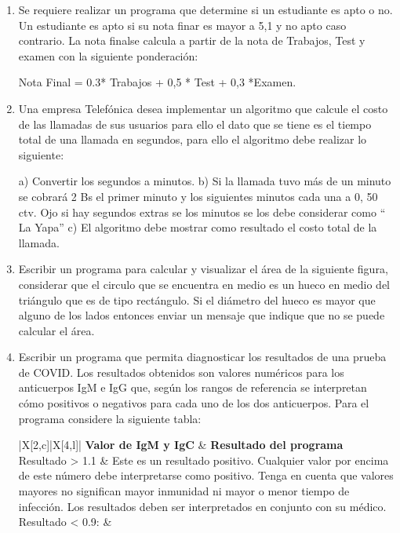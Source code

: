 \documentclass{scrartcl}
\begin{document}
\begin{enumerate}
		\item Se requiere realizar un programa que determine si un estudiante es apto o no. Un estudiante es apto si su nota finar es mayor a 5,1 y no apto caso contrario. La nota finalse calcula a partir de la nota de Trabajos, Test y examen con la siguiente ponderación:
		
		Nota Final = 0.3* Trabajos + 0,5 * Test + 0,3 *Examen.
		
		\item Una empresa Telefónica desea implementar un algoritmo que calcule el costo de las llamadas de sus usuarios para ello el dato que se tiene es el tiempo total de una llamada en segundos, para ello el algoritmo debe realizar lo siguiente:
		
		a) Convertir los segundos a minutos.
		b) Si la llamada tuvo más de un minuto se cobrará 2 Bs el primer minuto y los
		siguientes minutos cada una a 0, 50 ctv. Ojo si hay segundos extras se los
		minutos se los debe considerar como “ La Yapa”
		c) El algoritmo debe mostrar como resultado el costo total de la llamada.
		
		\item Escribir un programa para calcular y visualizar el área de la siguiente figura, considerar que el circulo que se encuentra en medio es un hueco en medio del triángulo que es de tipo rectángulo. Si el diámetro del hueco es mayor que alguno de los lados entonces enviar un mensaje que indique que no se puede calcular el área.
		
		\item Escribir un programa que permita diagnosticar los resultados de una prueba de COVID. Los resultados obtenidos son valores numéricos para los anticuerpos IgM e IgG que, según los rangos de referencia se interpretan cómo positivos o negativos para cada uno de los dos anticuerpos. Para el programa considere la siguiente tabla:
		
		\begin{table}[ht]
			\centering
			\begin{tblr}{|X[2,c]|X[4,l]|}
					\hline
					\textbf{Valor de IgM y IgC} & \textbf{Resultado del programa} \\
					Resultado > 1.1  &  
					\hline
					Este es un resultado positivo. Cualquier valor por encima de este número debe interpretarse como positivo. Tenga en cuenta que valores mayores no significan mayor inmunidad ni mayor o menor tiempo de infección. Los resultados deben ser interpretados en conjunto con su médico. \\
					\hline
					Resultado < 0.9:  &
				

\end{tblr}
\end{table}
\end{enumerate}
\end{document}

